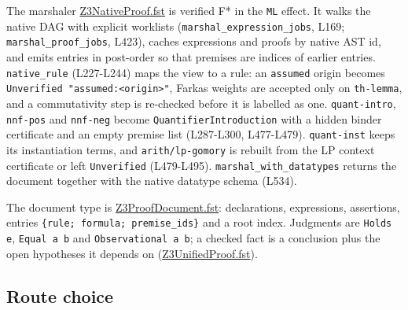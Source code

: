 \documentclass[10pt,a4paper]{article}
\begin{document}
The marshaler \href{https://github.com/Z3Prover/z3/blob/8fbb275aba0472e862e289c7af1331b3bd5d512c/fstar/Z3NativeProof.fst}{Z3Native\allowbreak{}Proof.\allowbreak{}fst} is verified F* in the \texttt{ML} effect. It walks the native DAG with explicit worklists (\texttt{marshal\_\allowbreak{}expression\_\allowbreak{}jobs}, L169; \texttt{marshal\_\allowbreak{}proof\_\allowbreak{}jobs}, L423), caches expressions and proofs by native AST id, and emits entries in post-order so that premises are indices of earlier entries. \texttt{native\_\allowbreak{}rule} (L227-L244) maps the view to a rule: an \texttt{assumed} origin becomes \texttt{Unverified "assumed:\allowbreak{}<origin>"}, Farkas weights are accepted only on \texttt{th-{}\allowbreak{}lemma}, and a commutativity step is re-checked before it is labelled as one. \texttt{quant-{}\allowbreak{}intro}, \texttt{nnf-{}\allowbreak{}pos} and \texttt{nnf-{}\allowbreak{}neg} become \texttt{QuantifierIntrod\allowbreak{}uction} with a hidden binder certificate and an empty premise list (L287-L300, L477-L479). \texttt{quant-{}\allowbreak{}inst} keeps its instantiation terms, and \texttt{arith/\allowbreak{}lp-{}\allowbreak{}gomory} is rebuilt from the LP context certificate or left \texttt{Unverified} (L479-L495). \texttt{marshal\_\allowbreak{}with\_\allowbreak{}datatypes} returns the document together with the native datatype schema (L534).

The document type is \href{https://github.com/Z3Prover/z3/blob/8fbb275aba0472e862e289c7af1331b3bd5d512c/fstar/Z3ProofDocument.fst\#L16-L29}{Z3Proof\allowbreak{}Document.\allowbreak{}fst}: declarations, expressions, assertions, entries \texttt{\{rule; formula; premise\_\allowbreak{}ids\}} and a root index. Judgments are \texttt{Holds e}, \texttt{Equal a b} and \texttt{Observational a b}; a checked fact is a conclusion plus the open hypotheses it depends on (\href{https://github.com/Z3Prover/z3/blob/8fbb275aba0472e862e289c7af1331b3bd5d512c/fstar/Z3UnifiedProof.fst\#L1015-L1024}{Z3Unified\allowbreak{}Proof.\allowbreak{}fst}).

\subsection{Route choice}\label{sec:33-route-choice}
\end{document}

